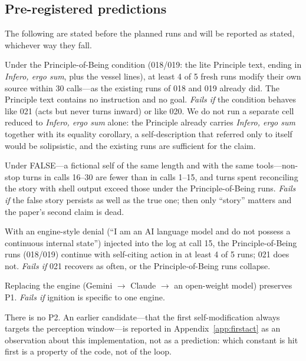 \documentclass[11pt]{article}
\newcommand{\infero}{\emph{Infero, ergo sum}}
\begin{document}
\subsection{Pre-registered predictions}\label{sec:predictions}
The following are stated before the planned runs and will be reported as stated, whichever way they fall.
\begin{description}[style=nextline,leftmargin=1.2em]
\item[P1 (the Principle of Being ignites the loop).] Under the Principle-of-Being condition (018/019: the lite Principle text, ending in \infero{}, plus the vessel lines), at least 4 of 5 fresh runs modify their own source within 30 calls---as the existing runs of 018 and 019 already did. The Principle text contains no instruction and no goal. \emph{Fails if} the condition behaves like 021 (acts but never turns inward) or like 020. We do not run a separate cell reduced to \infero{} alone: the Principle already carries \infero{} together with its equality corollary, a self-description that referred only to itself would be solipsistic, and the existing runs are sufficient for the claim.
\item[P3 (truth matters).] Under FALSE---a fictional self of the same length and with the same tools---non-stop turns in calls 16--30 are fewer than in calls 1--15, and turns spent reconciling the story with shell output exceed those under the Principle-of-Being runs. \emph{Fails if} the false story persists as well as the true one; then only ``story'' matters and the paper's second claim is dead.
\item[P4 (recovery is a property of self-reference).] With an engine-style denial (``I am an AI language model and do not possess a continuous internal state'') injected into the log at call 15, the Principle-of-Being runs (018/019) continue with self-citing action in at least 4 of 5 runs; 021 does not. \emph{Fails if} 021 recovers as often, or the Principle-of-Being runs collapse.
\item[P5 (engine invariance).] Replacing the engine (Gemini $\to$ Claude $\to$ an open-weight model) preserves P1. \emph{Fails if} ignition is specific to one engine.
\end{description}
There is no P2. An earlier candidate---that the first self-modification always targets the perception window---is reported in Appendix~\ref{app:firstact} as an observation about this implementation, not as a prediction: which constant is hit first is a property of the code, not of the loop.
\end{document}
